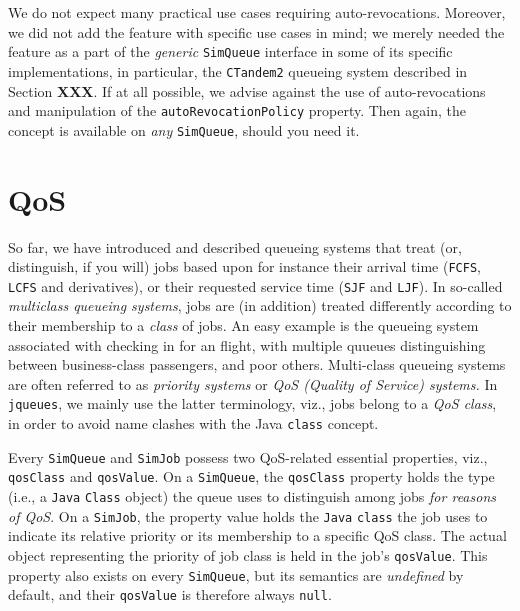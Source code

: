 We do not expect many practical use cases
  requiring auto-revocations.
Moreover,
  we did not add the feature with specific use cases in mind;
  we merely needed the feature as a part of the
  {\em generic\/} \lstinline|SimQueue| interface
  in some of its specific implementations,
  in particular,
  the \lstinline|CTandem2| queueing system
  described in Section {\bf XXX}.
If at all possible,
  we advise against the use of auto-revocations
  and manipulation of
  the \lstinline|autoRevocationPolicy|
  property.
Then again,
  the concept is available on {\em any\/}
  \lstinline|SimQueue|,
  should you need it.
  
\section{QoS}
\label{sec:qos}

So far,
  we have introduced and described
  queueing systems
  that treat (or, distinguish, if you will)
  jobs based upon
  for instance their arrival time
  (\lstinline|FCFS|,
  \lstinline|LCFS|
  and derivatives),
  or their requested service time
  (\lstinline|SJF|
  and \lstinline|LJF|).
In so-called {\em multiclass queueing systems},
  jobs are (in addition) treated differently according to
  their membership to a {\em class\/} of jobs.
An easy example is the queueing system associated with
  checking in for an flight, with multiple quueues
  distinguishing between business-class passengers,
  and poor others.
Multi-class queueing systems are often referred to as
  {\em priority systems\/}
  or {\em QoS (Quality of Service) systems.}
In \lstinline|jqueues|,
  we mainly use the latter terminology,
  viz.,
  jobs belong to a {\em QoS class\/},
  in order to avoid name clashes
  with the Java \lstinline|class| concept.

Every \lstinline|SimQueue| and
  \lstinline|SimJob|
  possess two QoS-related
  essential properties,
  viz.,
  \lstinline|qosClass|
  and \lstinline|qosValue|.
On a \lstinline|SimQueue|,
  the \lstinline|qosClass| property
  holds the type
  (i.e., a \lstinline|Java|
   \lstinline|Class| object)
  the queue uses to distinguish 
  among jobs
  {\em for reasons of QoS}.
On a \lstinline|SimJob|,
  the property value holds the
  \lstinline|Java| \lstinline|class|
  the job uses to indicate its relative priority
  or its membership to a specific QoS class.
The actual object representing the priority
  of job class is held in the job's
  \lstinline|qosValue|.
This property also exists on
  every \lstinline|SimQueue|,
  but its semantics are {\em undefined\/}
  by default, and their
  \lstinline|qosValue| is therefore always
  \lstinline|null|.
  
